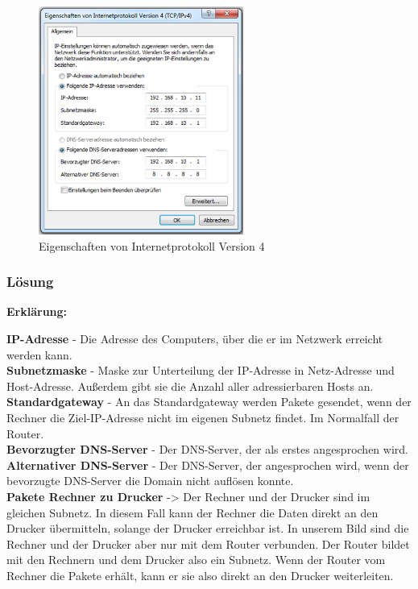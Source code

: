 \begin{figure}[htbp]
\begin{center}
\includegraphics[width=0.6\textwidth]{Bild4}
\caption{Eigenschaften von Internetprotokoll Version 4}
\end{center}
\end{figure}
 
\subsubsection{Lösung}
\textbf{Erklärung:}

\textbf{IP-Adresse} - Die Adresse des Computers, über die er im Netzwerk erreicht werden kann. \\
\textbf{Subnetzmaske} - Maske zur Unterteilung der IP-Adresse in Netz-Adresse und Host-Adresse. Außerdem gibt sie die Anzahl aller adressierbaren Hosts an. \\
\textbf{Standardgateway} - An das Standardgateway werden Pakete gesendet, wenn der Rechner die Ziel-IP-Adresse nicht im eigenen Subnetz findet. Im Normalfall der Router. \\
\textbf{Bevorzugter DNS-Server} - Der DNS-Server, der als erstes angesprochen wird.  \\
\textbf{Alternativer DNS-Server} - Der DNS-Server, der angesprochen wird, wenn der bevorzugte DNS-Server die Domain nicht auflösen konnte. \\

\textbf{Pakete Rechner zu Drucker}
-> Der Rechner und der Drucker sind im gleichen Subnetz. In diesem Fall kann der Rechner die Daten direkt an den Drucker übermitteln, solange der Drucker erreichbar ist. In unserem Bild sind die Rechner und der Drucker aber nur mit dem Router verbunden. Der Router bildet mit den Rechnern und dem Drucker also ein Subnetz. Wenn der Router vom Rechner die Pakete erhält, kann er sie also direkt an den Drucker weiterleiten. \\

